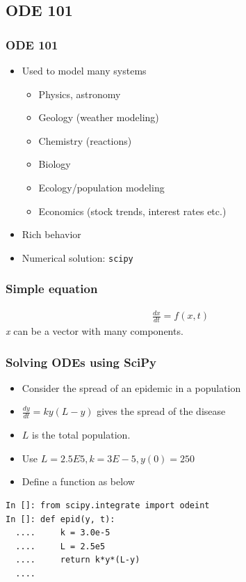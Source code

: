 \documentclass[14pt,compress]{beamer}
\newcommand{\typ}[1]{\lstinline{#1}}
\begin{document}
\subsection{ODE 101}


\begin{frame}
  \frametitle{ODE 101}
  \begin{itemize}
    \item Used to model many systems
        \begin{itemize}
            \item Physics, astronomy
            \item Geology (weather modeling)
            \item Chemistry (reactions)
            \item Biology
            \item Ecology/population modeling
            \item Economics (stock trends, interest rates etc.)
        \end{itemize}
    \item Rich behavior
    \item Numerical solution: \typ{scipy}
 \end{itemize}
\end{frame}

\begin{frame}
  \frametitle{Simple equation}
\begin{align}
    \frac{dx}{dt} = f(x, t)
\end{align}
\emph{x} can be a vector with many components.
\end{frame}


\begin{frame}[fragile]
\frametitle{Solving ODEs using SciPy}
\begin{itemize}
\item Consider the spread of an epidemic in a population
\item $\frac{dy}{dt} = ky(L-y)$ gives the spread of the disease
\item $L$ is the total population.
\item Use $L = 2.5E5, k = 3E-5, y(0) = 250$
\item Define a function as below
\end{itemize}
\small
\begin{lstlisting}
In []: from scipy.integrate import odeint
In []: def epid(y, t):
  ....     k = 3.0e-5
  ....     L = 2.5e5
  ....     return k*y*(L-y)
  ....
\end{lstlisting}
\end{frame}
\end{document}
